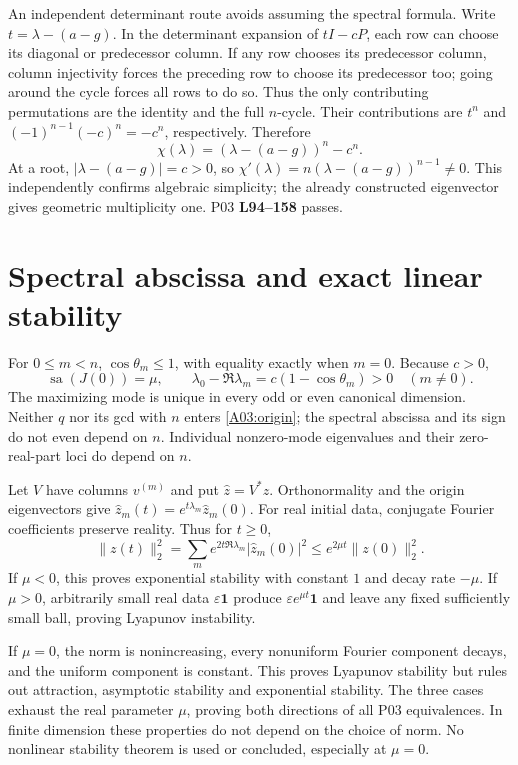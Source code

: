 \documentclass[11pt]{article}
\newcommand{\one}{\mathbf 1}
\newcommand{\sa}{\operatorname{sa}}
\newcommand{\lin}[1]{\textbf{L#1}}
\begin{document}
An independent determinant route avoids assuming the spectral formula.
Write $t=\lambda-(a-g)$. In the determinant expansion of $tI-cP$, each row
can choose its diagonal or predecessor column. If any row chooses its
predecessor column, column injectivity forces the preceding row to choose
its predecessor too; going around the cycle forces all rows to do so.
Thus the only contributing permutations are the identity and the full
$n$-cycle. Their contributions are $t^n$ and
$(-1)^{n-1}(-c)^n=-c^n$, respectively. Therefore
\begin{equation}
 \chi(\lambda)=(\lambda-(a-g))^n-c^n.\label{A03:characteristic}
\end{equation}
At a root, $|\lambda-(a-g)|=c>0$, so
$\chi'(\lambda)=n(\lambda-(a-g))^{n-1}\ne0$. This independently confirms
algebraic simplicity; the already constructed eigenvector gives geometric
multiplicity one. P03 \lin{94--158} passes.

\section{Spectral abscissa and exact linear stability}
For $0\le m<n$, $\cos\theta_m\le1$, with equality exactly when $m=0$.
Because $c>0$,
\[
 \sa(J(0))=\mu,\qquad
 \lambda_0-\Re\lambda_m=c(1-\cos\theta_m)>0\quad(m\ne0).
\]
The maximizing mode is unique in every odd or even canonical dimension.
Neither $q$ nor its gcd with $n$ enters \eqref{A03:origin}; the spectral
abscissa and its sign do not even depend on $n$. Individual nonzero-mode
eigenvalues and their zero-real-part loci do depend on $n$.

Let $V$ have columns $v^{(m)}$ and put $\widehat z=V^*z$. Orthonormality and
the origin eigenvectors give $\widehat z_m(t)=e^{t\lambda_m}\widehat z_m(0)$.
For real initial data, conjugate Fourier coefficients preserve reality.
Thus for $t\ge0$,
\[
 \|z(t)\|_2^2=\sum_m e^{2t\Re\lambda_m}|\widehat z_m(0)|^2
             \le e^{2\mu t}\|z(0)\|_2^2.
\]
If $\mu<0$, this proves exponential stability with constant $1$ and decay
rate $-\mu$. If $\mu>0$, arbitrarily small real data $\varepsilon\one$
produce $\varepsilon e^{\mu t}\one$ and leave any fixed sufficiently small
ball, proving Lyapunov instability.

If $\mu=0$, the norm is nonincreasing, every nonuniform Fourier component
decays, and the uniform component is constant. This proves Lyapunov
stability but rules out attraction, asymptotic stability and exponential
stability. The three cases exhaust the real parameter $\mu$, proving both
directions of all P03 equivalences. In finite dimension these properties
do not depend on the choice of norm. No nonlinear stability theorem is used
or concluded, especially at $\mu=0$.
\end{document}
